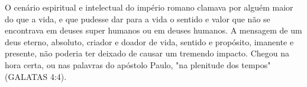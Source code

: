\documentclass[
	12pt,				%
	openright,			%
	twoside,			%
	a4paper,			%
	english,			%
	french,				%
	spanish,			%
	brazil				%
	]{abntex2}
\begin{document}
O cenário espiritual e intelectual do império romano clamava por alguém maior do que a vida, e que pudesse dar para a vida o sentido e valor que não se encontrava em deuses super humanos ou em deuses humanos. A mensagem de um deus eterno, absoluto, criador e doador de vida, sentido e propósito, imanente e presente, não poderia ter deixado de causar um tremendo impacto. Chegou na hora certa, ou nas palavras do apóstolo Paulo, "na plenitude dos tempos" (GALATAS 4:4).


\end{document}

